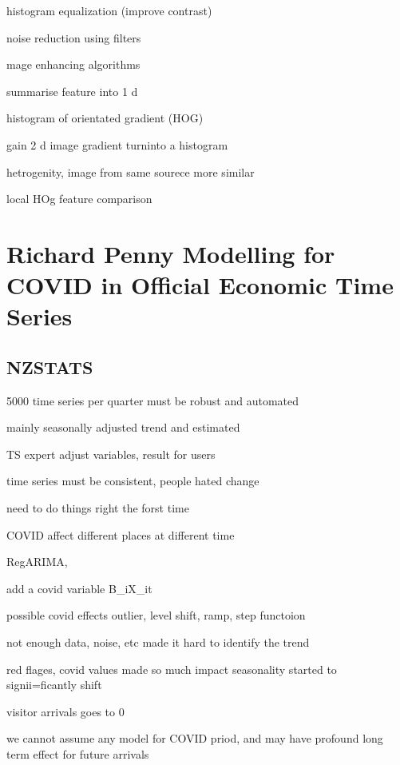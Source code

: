 \documentclass[
]{book}
\begin{document}
histogram equalization (improve contrast)

noise reduction using filters

mage enhancing algorithms

summarise feature into 1 d

histogram of orientated gradient (HOG)

gain 2 d image gradient turninto a histogram

hetrogenity, image from same sourece more similar

local HOg feature comparison

\hypertarget{richard-penny-modelling-for-covid-in-official-economic-time-series}{%
\chapter*{Richard Penny \textbar{} Modelling for COVID in Official Economic Time Series}\label{richard-penny-modelling-for-covid-in-official-economic-time-series}}

\hypertarget{nzstats}{%
\section{NZSTATS}\label{nzstats}}

5000 time series per quarter
must be robust and automated

mainly seasonally adjusted trend and estimated

TS expert adjust variables, result for users

time series must be consistent, people hated change

need to do things right the forst time

COVID affect different places at different time

RegARIMA,

add a covid variable B\_iX\_it

possible covid effects outlier, level shift, ramp, step functoion

not enough data, noise, etc made it hard to identify the trend

red flages, covid values made so much impact seasonality started to signii=ficantly shift

visitor arrivals goes to 0

we cannot assume any model for COVID priod, and may have profound long term effect for future arrivals
\end{document}

